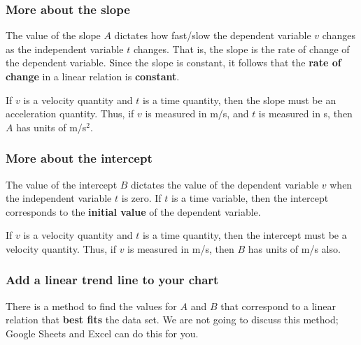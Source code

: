 \subsubsection{More about the slope}
The value of the slope $A$ dictates how fast/slow the dependent variable $v$ changes as the independent variable $t$ changes. That is, the slope is the rate of change of the dependent variable. Since the slope is constant, it follows that the \textbf{rate of change} in a linear relation is \textbf{constant}.

If $v$ is a velocity quantity and $t$ is a time quantity, then the slope must be an acceleration quantity. Thus, if $v$ is measured in m/s, and $t$ is measured in s, then $A$ has units of m/s$^{2}$.
\subsubsection{More about the intercept}
The value of the intercept $B$ dictates the value of the dependent variable $v$ when the independent variable $t$ is zero. If $t$ is a time variable, then the intercept corresponds to the \textbf{initial value} of the dependent variable.

If $v$ is a velocity quantity and $t$ is a time quantity, then the intercept must be a velocity quantity. Thus, if $v$ is measured in m/s, then $B$ has units of m/s also.
\subsubsection{Add a linear trend line to your chart}
There is a method to find the values for $A$ and $B$ that correspond to a linear relation that \textbf{best fits} the data set. We are not going to discuss this method; Google Sheets and Excel can do this for you.


